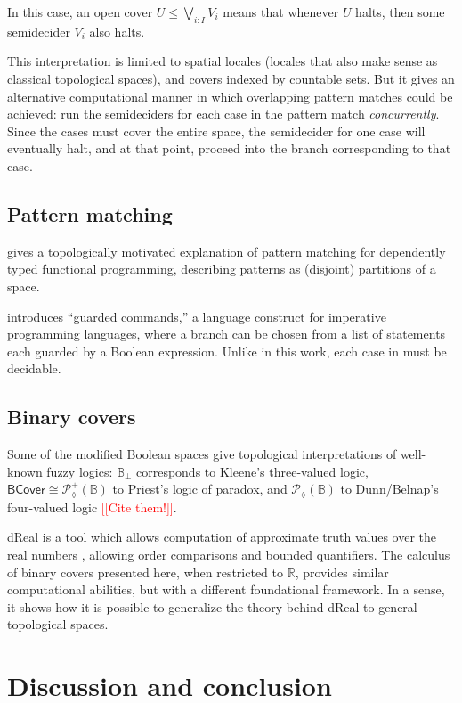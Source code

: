 \documentclass[conference]{IEEEtran}
\newcommand{\PLower}{\mathcal{P}_\lozenge}
\newcommand{\R}{\mathbb{R}}
\newcommand{\bool}{\mathbb{B}}
\newcommand{\note}[1]{\textcolor{red}{[[{#1}]]}}
\begin{document}
In this case, an open cover $U \le \bigvee_{i : I} V_i$ means that whenever $U$ halts, then some semidecider $V_i$ also halts.

This interpretation is limited to spatial locales (locales that also make sense as classical topological spaces), and covers indexed by countable sets. But it gives an alternative computational manner in which overlapping pattern matches could be achieved: run the semideciders for each case in the pattern match \emph{concurrently}. Since the cases must cover the entire space, the semidecider for one case will eventually halt, and at that point, proceed into the branch corresponding to that case.

\subsection{Pattern matching}

\cite{coquand1992} gives a topologically motivated explanation of pattern matching for dependently typed functional programming, describing patterns as (disjoint) partitions of a space.

\cite{dijkstra} introduces ``guarded commands,'' a language construct for imperative programming languages, where a branch can be chosen from a list of statements each guarded by a Boolean expression. Unlike in this work, each case in \cite{dijkstra} must be decidable.

\subsection{Binary covers}

Some of the modified Boolean spaces give topological interpretations of well-known fuzzy logics: $\bool_\bot$ corresponds to Kleene's three-valued logic, $\mathsf{BCover} \cong \PLower^+(\bool)$ to Priest's logic of paradox, and $\PLower(\bool)$ to Dunn/Belnap's four-valued logic \note{Cite them!}.

dReal is a tool which allows computation of approximate truth values over the real numbers \cite{dReal}, allowing order comparisons and bounded quantifiers. The calculus of binary covers presented here, when restricted to $\R$, provides similar computational abilities, but with a different foundational framework. In a sense, it shows how it is possible to generalize the theory behind dReal to general topological spaces.

\section{Discussion and conclusion}
\end{document}
